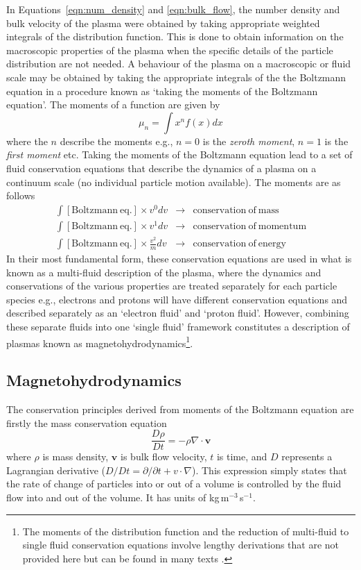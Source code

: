 In Equations~\ref{eqn:num_density} and \ref{eqn:bulk_flow}, the number density and bulk velocity of the plasma were obtained by taking appropriate weighted integrals of the distribution function. This is done to obtain information on the macroscopic properties of the plasma when the specific details of the particle distribution are not needed. A behaviour of the plasma on a macroscopic or fluid scale may be obtained by taking the appropriate integrals of the the Boltzmann equation in a procedure known as `taking the moments of the Boltzmann equation'. The moments of a function are given by 
\begin{equation}
\mu_n = \int x^n f(x) dx
\end{equation}
where the $n$ describe the moments e.g., $n=0$ is the {\it zeroth moment},  $n=1$ is the {\it first moment} etc. Taking the moments of the Boltzmann equation lead to a set of fluid conservation equations that describe the dynamics of a plasma on a continuum scale (no individual particle motion available). The moments are as follows
\begin{eqnarray*}
\int [\mathrm{Boltzmann~ eq.}]\times v^0 dv &\rightarrow& \mathrm{conservation~of~mass} \\
\int [\mathrm{Boltzmann~eq.}]\times v^1 dv &\rightarrow& \mathrm{conservation~of~momentum} \\
\int [\mathrm{Boltzmann~eq.}]\times \frac{v^2}{m} dv &\rightarrow& \mathrm{conservation~of~energy}
\end{eqnarray*}
In their most fundamental form, these conservation equations are used in what is known as a multi-fluid description of the plasma, where the dynamics and conservations of the various properties are treated separately for each particle species e.g., electrons and protons will have different conservation equations and described separately as an \textquoteleft electron fluid' and \textquoteleft proton fluid'. However, combining these separate fluids into one \textquoteleft single fluid' framework constitutes a description of plasmas known as magnetohydrodynamics\footnote{The moments of the distribution function and the reduction of multi-fluid to single fluid conservation equations involve lengthy derivations that are not provided here but can be found in many texts \citep{goossens2003, inan2011}.}.
\clearpage
\subsection{Magnetohydrodynamics}\label{sec:12}
The conservation principles  derived from moments of the Boltzmann equation are firstly the mass conservation equation
\begin{equation}
\frac{D\rho}{Dt} = -\rho\nabla\cdot \mathbf{v}
\end{equation}
where $\rho$ is mass density, $\mathbf{v}$ is bulk flow velocity, $t$ is time, and $D$ represents a Lagrangian derivative ($D/Dt = \partial /\partial t + v\cdot \nabla$). This expression simply states that the rate of change of particles into or out of a volume is controlled by the fluid flow into and out of the volume. It has units of kg\,m$^{-3}$\,s$^{-1}$.

